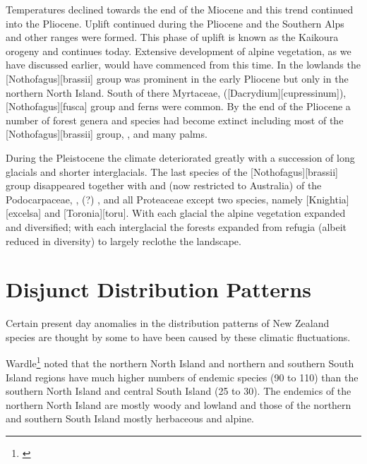 Temperatures declined towards the end of the Miocene and this trend continued into the Pliocene.
Uplift continued during the Pliocene and the Southern Alps and other ranges were formed.
This phase of uplift is known as the Kaikoura orogeny and continues today.
Extensive development of alpine vegetation, as we have discussed earlier, would have commenced from this time.
In the lowlands the [Nothofagus][brassii] group was prominent in the early Pliocene but only in the northern North Island.
South of there Myrtaceae,  ([Dacrydium][cupressinum]),  [Nothofagus][fusca] group and ferns were common.
By the end of the Pliocene a number of forest genera and species had become extinct including most of the [Nothofagus][brassii] group, ,  and many palms.

During the Pleistocene the climate deteriorated greatly with a succession of long glacials and shorter interglacials.
The last species of the [Nothofagus][brassii] group disappeared together with  and  (now restricted to Australia) of the Podocarpaceae, , (?) ,  and all Proteaceae except two species, namely [Knightia][excelsa] and [Toronia][toru].
With each glacial the alpine vegetation expanded and diversified; with each interglacial the forests expanded from refugia (albeit reduced in diversity) to largely reclothe the landscape.

\section{Disjunct Distribution Patterns}

Certain present day anomalies in the distribution patterns of New Zealand species are thought by some to have been caused by these climatic fluctuations.

Wardle\footnote{\cite{wardle1963evolution}} noted that the northern North Island and northern and southern South Island regions have much higher numbers of endemic species (90 to 110) than the southern North Island and central South Island (25 to 30).
The endemics of the northern North Island are mostly woody and lowland and those of the northern and southern South Island mostly herbaceous and alpine.

